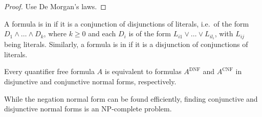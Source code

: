 \begin{proof}
  Use De Morgan's laws.
\end{proof}

A formula is in  if it is a conjunction of
disjunctions of literals, i.e.~of the form $D_1 \land \ldots \land D_k$, where
$k \ge 0$ and each $D_i$ is of the form $L_{i1} \lor \ldots \lor L_{i l_i}$,
with $L_{ij}$ being literals.
Similarly, a formula is in  if it is a
disjunction of conjunctions of literals.

\begin{proposition}
  Every quantifier free formula $A$ is equivalent to formulas $A^{\text{DNF}}$
  and $A^{\text{CNF}}$ in disjunctive and conjunctive normal forms,
  respectively.
\end{proposition}

\begin{remark}
  While the negation normal form can be found efficiently, finding conjunctive
  and disjunctive normal forms is an NP-complete problem.
\end{remark}

